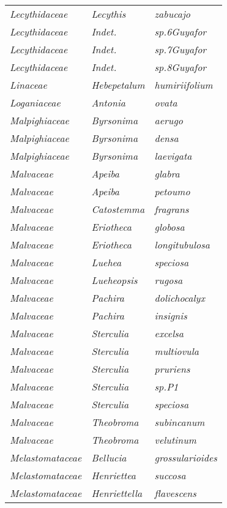 \documentclass[fleqn,10pt]{ArtEcoFoG} %
\renewenvironment{table}{\begin{table*}}{\end{table*}\ignorespacesafterend}
\begin{document}
\begin{table}
\begin{tabular}[t]{lll}
\addlinespace
\em{Lecythidaceae} & \em{Lecythis} & \em{zabucajo}\\
\em{Lecythidaceae} & \em{Indet.} & \em{sp.6Guyafor}\\
\em{Lecythidaceae} & \em{Indet.} & \em{sp.7Guyafor}\\
\em{Lecythidaceae} & \em{Indet.} & \em{sp.8Guyafor}\\
\em{Linaceae} & \em{Hebepetalum} & \em{humiriifolium}\\
\addlinespace
\em{Loganiaceae} & \em{Antonia} & \em{ovata}\\
\em{Malpighiaceae} & \em{Byrsonima} & \em{aerugo}\\
\em{Malpighiaceae} & \em{Byrsonima} & \em{densa}\\
\em{Malpighiaceae} & \em{Byrsonima} & \em{laevigata}\\
\em{Malvaceae} & \em{Apeiba} & \em{glabra}\\
\addlinespace
\em{Malvaceae} & \em{Apeiba} & \em{petoumo}\\
\em{Malvaceae} & \em{Catostemma} & \em{fragrans}\\
\em{Malvaceae} & \em{Eriotheca} & \em{globosa}\\
\em{Malvaceae} & \em{Eriotheca} & \em{longitubulosa}\\
\em{Malvaceae} & \em{Luehea} & \em{speciosa}\\
\addlinespace
\em{Malvaceae} & \em{Lueheopsis} & \em{rugosa}\\
\em{Malvaceae} & \em{Pachira} & \em{dolichocalyx}\\
\em{Malvaceae} & \em{Pachira} & \em{insignis}\\
\em{Malvaceae} & \em{Sterculia} & \em{excelsa}\\
\em{Malvaceae} & \em{Sterculia} & \em{multiovula}\\
\addlinespace
\em{Malvaceae} & \em{Sterculia} & \em{pruriens}\\
\em{Malvaceae} & \em{Sterculia} & \em{sp.P1}\\
\em{Malvaceae} & \em{Sterculia} & \em{speciosa}\\
\em{Malvaceae} & \em{Theobroma} & \em{subincanum}\\
\em{Malvaceae} & \em{Theobroma} & \em{velutinum}\\
\addlinespace
\em{Melastomataceae} & \em{Bellucia} & \em{grossularioides}\\
\em{Melastomataceae} & \em{Henriettea} & \em{succosa}\\
\em{Melastomataceae} & \em{Henriettella} & \em{flavescens}\\

\end{tabular}
\end{table}
\end{document}
